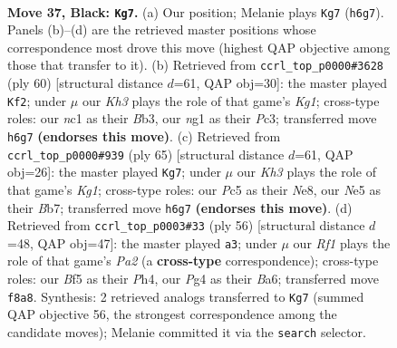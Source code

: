 \documentclass[11pt]{article}
\begin{document}
\clearpage

\begin{figure}[p]\centering
\begin{subfigure}{0.46\textwidth}\centering
\resizebox{\linewidth}{!}{%
\newchessgame
\chessboard[
  setfen={5r2/4r3/1p5k/p1p1nb2/P5p1/2P1R3/K5PP/2N2BNR b - - 3 37},
  showmover=false,
  pgfstyle=straightmove, color=movearrow, markmove={h6-g7}
]}
\caption{}
\end{subfigure}\hfill
\begin{subfigure}{0.46\textwidth}\centering
\resizebox{\linewidth}{!}{%
\newchessgame
\chessboard[
  setfen={5k2/1p2r3/8/p2p2pp/P2P4/1BP1n1P1/1P2R3/6K1 w - - 0 31},
  showmover=false,
  pgfstyle=straightmove, color=movearrow, markmove={g1-f2}
]}
\caption{}
\end{subfigure}
\\[4pt]
\begin{subfigure}{0.46\textwidth}\centering
\resizebox{\linewidth}{!}{%
\newchessgame
\chessboard[
  setfen={4n1k1/Rbr2p2/1p4p1/1P1p3p/3N3P/3P2PB/5P2/6K1 b - - 3 33},
  showmover=false,
  pgfstyle=straightmove, color=movearrow, markmove={g8-g7}
]}
\caption{}
\end{subfigure}\hfill
\begin{subfigure}{0.46\textwidth}\centering
\resizebox{\linewidth}{!}{%
\newchessgame
\chessboard[
  setfen={4k3/p1r4p/B4pp1/2N1p3/1P1n1PbP/2R3P1/P5K1/8 w - - 0 29},
  showmover=false,
  pgfstyle=straightmove, color=movearrow, markmove={a2-a3}
]}
\caption{}
\end{subfigure}
\caption{\textbf{Move 37, Black: \texttt{Kg7}.} (a) Our position; Melanie plays \texttt{Kg7} (\texttt{h6g7}). Panels (b)--(d) are the retrieved master positions whose correspondence most drove this move (highest QAP objective among those that transfer to it). (b) Retrieved from \texttt{ccrl\_top\_p0000\#3628} (ply 60) [structural distance $d$=61, QAP obj=30]: the master played \texttt{Kf2}; under $\mu$ our \emph{Kh3} plays the role of that game's \emph{Kg1}; cross-type roles: our \emph{n}c1 as their \emph{B}b3, our \emph{n}g1 as their \emph{P}c3; transferred move \texttt{h6g7} \textbf{(endorses this move)}. (c) Retrieved from \texttt{ccrl\_top\_p0000\#939} (ply 65) [structural distance $d$=61, QAP obj=26]: the master played \texttt{Kg7}; under $\mu$ our \emph{Kh3} plays the role of that game's \emph{Kg1}; cross-type roles: our \emph{P}c5 as their \emph{N}e8, our \emph{N}e5 as their \emph{B}b7; transferred move \texttt{h6g7} \textbf{(endorses this move)}. (d) Retrieved from \texttt{ccrl\_top\_p0003\#33} (ply 56) [structural distance $d$=48, QAP obj=47]: the master played \texttt{a3}; under $\mu$ our \emph{Rf1} plays the role of that game's \emph{Pa2} (a \textbf{cross-type} correspondence); cross-type roles: our \emph{B}f5 as their \emph{P}h4, our \emph{P}g4 as their \emph{B}a6; transferred move \texttt{f8a8}. Synthesis: 2 retrieved analogs transferred to \texttt{Kg7} (summed QAP objective 56, the strongest correspondence among the candidate moves); Melanie committed it via the \texttt{search} selector.}
\label{fig:thought-m73}
\end{figure}
\end{document}
